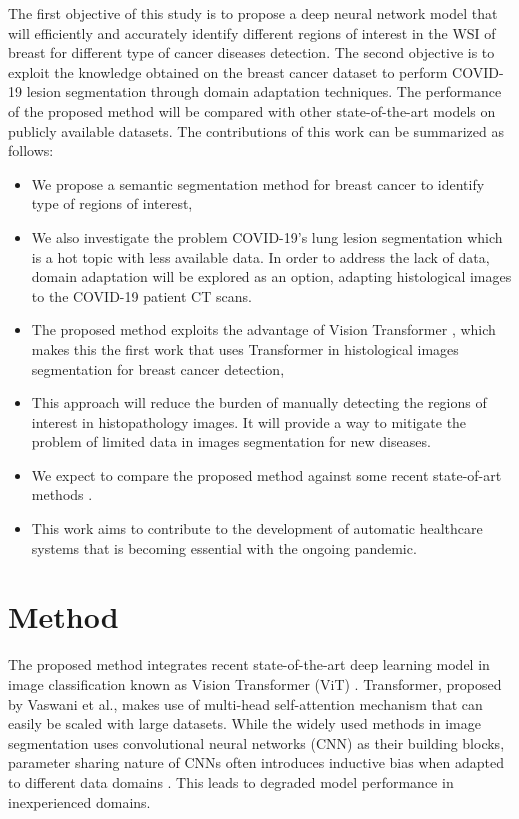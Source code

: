 \documentclass[final]{cvpr}
\begin{document}
The first objective of this study is to propose a deep neural network model that will efficiently and accurately identify different regions of interest in the WSI of breast for different type of cancer diseases detection. The second objective is to exploit the knowledge obtained on the breast cancer dataset to perform COVID-19 lesion segmentation through domain adaptation techniques. The performance of the proposed method will be compared with other state-of-the-art models \cite{chan2019histosegnet, chen2021transunet, Fu_2018, He2020.04.13.20063941} on publicly available datasets. The contributions of this work can be summarized as follows:
\begin{itemize}
    \item We propose a semantic segmentation method for breast cancer to identify type of regions of interest,
    \item We also investigate the problem COVID-19's lung lesion segmentation which is a hot topic with less available data. In order to address the lack of data, domain adaptation will be explored as an option, adapting histological images to the COVID-19 patient CT scans.
    \item The proposed method exploits the advantage of Vision Transformer \cite{dosovitskiy2020image}, which makes this the first work that uses Transformer in histological images segmentation for breast cancer detection,
    \item This approach will reduce the burden of manually detecting the regions of interest in histopathology images. It will provide a way to mitigate the problem of limited data in images segmentation for new diseases.
    \item We expect to compare the proposed method against some recent state-of-art methods \cite{dosovitskiy2020image,touvron2021training}.
    \item This work aims to contribute to the development of automatic healthcare systems that is becoming essential with the ongoing pandemic.
\end{itemize}


\section{Method}
The proposed method integrates recent state-of-the-art deep learning model in image classification known as Vision Transformer (ViT) \cite{dosovitskiy2020image}. Transformer, proposed by Vaswani et al.\cite{vaswani2017attention}, makes use of multi-head self-attention mechanism that can easily be scaled with large datasets. While the widely used methods in image segmentation uses convolutional neural networks (CNN) as their building blocks, parameter sharing nature of CNNs often introduces inductive bias when adapted to different data domains \cite{cohen2017inductive}. This leads to degraded model performance in inexperienced domains.
\end{document}
